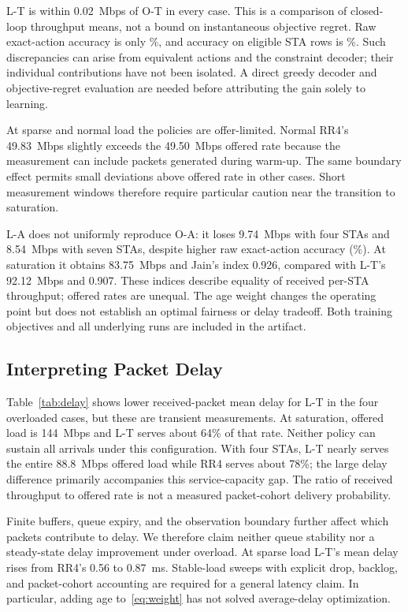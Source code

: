\documentclass[10pt,journal,onecolumn]{IEEEtran}
\begin{document}
L-T is within 0.02~Mbps of O-T in every case. This is a comparison of
closed-loop throughput means, not a bound on instantaneous objective regret.
Raw exact-action accuracy is only \TExact\%, and accuracy on eligible STA
rows is \TActiveAccuracy\%. Such discrepancies can arise from equivalent
actions and the constraint decoder; their individual contributions have not
been isolated. A direct greedy decoder and objective-regret evaluation are
needed before attributing the gain solely to learning.

At sparse and normal load the policies are offer-limited. Normal RR4's
49.83~Mbps slightly exceeds the 49.50~Mbps offered rate because the
measurement can include packets generated during warm-up. The same boundary
effect permits small deviations above offered rate in other cases.
Short measurement windows therefore require particular caution near
the transition to saturation.

L-A does not uniformly reproduce O-A: it loses 9.74~Mbps with four STAs
and 8.54~Mbps with seven STAs, despite higher raw exact-action accuracy
(\AExact\%). At saturation it obtains 83.75~Mbps and Jain's index 0.926,
compared with L-T's 92.12~Mbps and 0.907. These indices describe equality
of received per-STA throughput; offered rates are unequal. The age weight
changes the operating point but does not establish an optimal fairness or
delay tradeoff. Both training objectives and all underlying runs are included
in the artifact.

\subsection{Interpreting Packet Delay}

Table~\ref{tab:delay} shows lower received-packet mean delay for L-T in the
four overloaded cases, but these are transient measurements. At saturation,
offered load is 144~Mbps and L-T serves about 64\% of that rate. Neither
policy can sustain all arrivals under this configuration. With four STAs,
L-T nearly serves the entire 88.8~Mbps offered load while RR4 serves about
78\%; the large delay difference primarily accompanies this service-capacity
gap. The ratio of received throughput to offered rate is not a measured
packet-cohort delivery probability.

Finite buffers, queue expiry, and the observation boundary further affect
which packets contribute to delay. We therefore claim neither queue
stability nor a steady-state delay improvement under overload. At sparse
load L-T's mean delay rises from RR4's 0.56 to 0.87~ms. Stable-load sweeps
with explicit drop, backlog, and packet-cohort accounting are required for
a general latency claim. In particular, adding age to~\eqref{eq:weight}
has not solved average-delay optimization.
\end{document}
